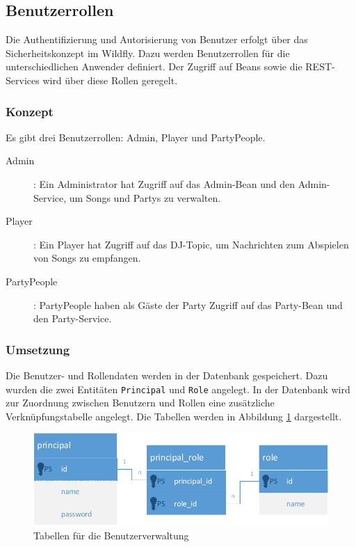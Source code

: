 \subsection{Benutzerrollen}
Die Authentifizierung und Autorisierung von Benutzer erfolgt über das Sicherheitskonzept im Wildfly. Dazu werden Benutzerrollen für die unterschiedlichen Anwender definiert. Der Zugriff auf Beans sowie die REST-Services wird über diese Rollen geregelt. 

\subsubsection{Konzept}
Es gibt drei Benutzerrollen: Admin, Player und PartyPeople.
\begin{description}
	\item[Admin]: Ein Administrator hat Zugriff auf das Admin-Bean und den Admin-Service, um Songs und Partys zu verwalten.
	\item[Player]: Ein Player hat Zugriff auf das DJ-Topic, um Nachrichten zum Abspielen von Songs zu empfangen.
	\item[PartyPeople]: PartyPeople haben als Gäste der Party Zugriff auf das Party-Bean und den Party-Service.
\end{description}

\subsubsection{Umsetzung}
Die Benutzer- und Rollendaten werden in der Datenbank gespeichert. Dazu wurden die zwei Entitäten \texttt{Principal} und \texttt{Role} angelegt. In der Datenbank wird zur Zuordnung zwischen Benutzern und Rollen eine zusätzliche Verknüpfungstabelle angelegt. Die Tabellen werden in Abbildung \ref{fig:BenutzerRollen} dargestellt.

\begin{figure}[tbh]
\centering
\includegraphics[width=1.0\linewidth]{Bilder/BenutzerRollen}
\caption{Tabellen für die Benutzerverwaltung}
\label{fig:BenutzerRollen}
\end{figure}

